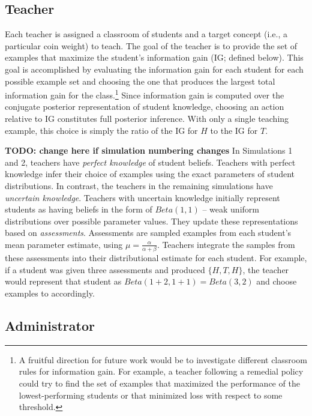\documentclass[10pt, letterpaper]{article}
\begin{document}
\subsection{Teacher}\label{teacher}

Each teacher is assigned a classroom of students and a target concept
(i.e., a particular coin weight) to teach. The goal of the teacher is to
provide the set of examples that maximize the student's information gain
(IG; defined below). This goal is accomplished by evaluating the
information gain for each student for each possible example set and
choosing the one that produces the largest total information gain for
the class.\footnote{A fruitful direction for future work would be to
  investigate different classroom rules for information gain. For
  example, a teacher following a remedial policy could try to find the
  set of examples that maximized the performance of the
  lowest-performing students or that minimized loss with respect to some
  threshold.} Since information gain is computed over the conjugate
posterior representation of student knowledge, choosing an action
relative to IG constitutes full posterior inference. With only a single
teaching example, this choice is simply the ratio of the IG for \(H\) to
the IG for \(T\).

\textbf{TODO: change here if simulation numbering changes} In
Simulations 1 and 2, teachers have \emph{perfect knowledge} of student
beliefs. Teachers with perfect knowledge infer their choice of examples
using the exact parameters of student distributions. In contrast, the
teachers in the remaining simulations have \emph{uncertain knowledge}.
Teachers with uncertain knowledge initially represent students as having
beliefs in the form of \(Beta(1,1)\) -- weak uniform distributions over
possible parameter values. They update these representations based on
\emph{assessments}. Assessments are sampled examples from each student's
mean parameter estimate, using \(\mu = \frac{\alpha}{\alpha + \beta}\).
Teachers integrate the samples from these assessments into their
distributional estimate for each student. For example, if a student was
given three assessments and produced \(\{H, T, H\}\), the teacher would
represent that student as \(Beta(1+2,1+1) = Beta(3,2)\) and choose
examples to accordingly.

\subsection{Administrator}\label{administrator}
\end{document}
